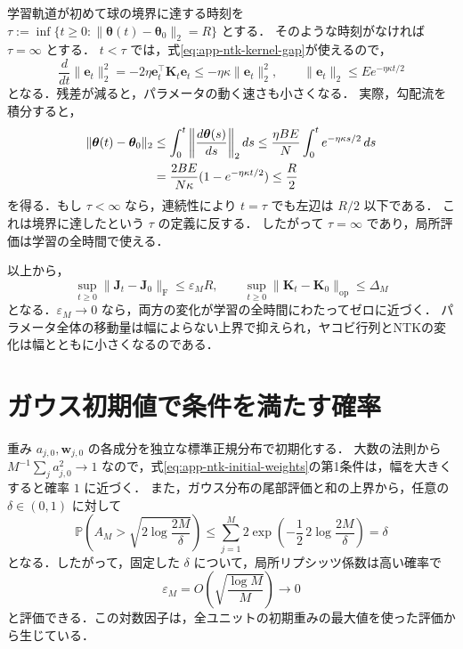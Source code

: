 \documentclass[../main.tex]{subfiles}
\begin{document}
学習軌道が初めて球の境界に達する時刻を
$\tau:=\inf\{t\geq0:\|\bm{\theta}(t)-\bm{\theta}_0\|_2=R\}$ とする．
そのような時刻がなければ $\tau=\infty$ とする．
$t<\tau$ では，式\eqref{eq:app-ntk-kernel-gap}が使えるので，
\begin{equation}
  \frac{d}{dt}\|\bm{e}_t\|_2^2
  =-2\eta\bm{e}_t^\top\bm{K}_t\bm{e}_t
  \leq-\eta\kappa\|\bm{e}_t\|_2^2,
  \qquad
  \|\bm{e}_t\|_2\leq E e^{-\eta\kappa t/2}
  \label{eq:app-ntk-residual-decay}
\end{equation}
となる．残差が減ると，パラメータの動く速さも小さくなる．
実際，勾配流を積分すると，
\begin{align}
  \|\bm{\theta}(t)-\bm{\theta}_0\|_2
  &\leq\int_0^t\left\|\frac{d\bm{\theta}(s)}{ds}\right\|_2ds
  \leq\frac{\eta BE}{N}\int_0^t e^{-\eta\kappa s/2}\,ds\notag\\
  &=\frac{2BE}{N\kappa}(1-e^{-\eta\kappa t/2})
  \leq\frac R2
  \label{eq:app-ntk-displacement}
\end{align}
を得る．もし $\tau<\infty$ なら，連続性により $t=\tau$ でも左辺は $R/2$ 以下である．
これは境界に達したという $\tau$ の定義に反する．
したがって $\tau=\infty$ であり，局所評価は学習の全時間で使える．

以上から，
\begin{equation}
  \sup_{t\geq0}\|\bm{J}_t-\bm{J}_0\|_{\mathrm F}
  \leq\varepsilon_M R,
  \qquad
  \sup_{t\geq0}\|\bm{K}_t-\bm{K}_0\|_{\mathrm{op}}
  \leq\Delta_M
  \label{eq:app-ntk-uniform-stability}
\end{equation}
となる．$\varepsilon_M\to0$ なら，両方の変化が学習の全時間にわたってゼロに近づく．
パラメータ全体の移動量は幅によらない上界で抑えられ，ヤコビ行列とNTKの変化は幅とともに小さくなるのである．

\section{ガウス初期値で条件を満たす確率}

重み $a_{j,0},\bm{w}_{j,0}$ の各成分を独立な標準正規分布で初期化する．
大数の法則から $M^{-1}\sum_j a_{j,0}^2\to1$ なので，式\eqref{eq:app-ntk-initial-weights}の第1条件は，幅を大きくすると確率 $1$ に近づく．
また，ガウス分布の尾部評価と和の上界から，任意の $\delta\in(0,1)$ に対して
\begin{equation}
  \mathbb{P}\!\left(
    A_M>\sqrt{2\log\frac{2M}{\delta}}\right)
  \leq\sum_{j=1}^M
    2\exp\!\left(-\frac12\,2\log\frac{2M}{\delta}\right)
  =\delta
  \label{eq:app-ntk-gaussian-maximum}
\end{equation}
となる．したがって，固定した $\delta$ について，局所リプシッツ係数は高い確率で
\begin{equation}
  \varepsilon_M
  =O\!\left(\sqrt{\frac{\log M}{M}}\right)\longrightarrow0
  \label{eq:app-ntk-local-rate}
\end{equation}
と評価できる．この対数因子は，全ユニットの初期重みの最大値を使った評価から生じている．
\end{document}

